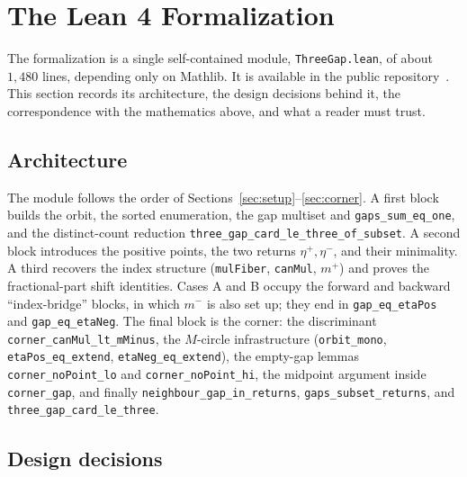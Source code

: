 \documentclass[11pt,reqno]{amsart}
\theoremstyle{plain}
\theoremstyle{definition}
\theoremstyle{remark}
\newcommand{\etap}{\eta^{+}}
\newcommand{\etam}{\eta^{-}}
\newcommand{\mpl}{m^{+}}
\newcommand{\mmi}{m^{-}}
\newcommand{\code}[1]{\texttt{#1}}
\begin{document}
\section{The Lean 4 Formalization}\label{sec:lean}

The formalization is a single self-contained module,
\code{ThreeGap.lean}, of about $1{,}480$ lines, depending only on
Mathlib.  It is available in the public repository~\cite{KunertThreeGap2026}.  This section
records its architecture, the design decisions behind it, the correspondence
with the mathematics above, and what a reader must trust.

\subsection{Architecture}

The module follows the order of Sections~\ref{sec:setup}--\ref{sec:corner}.  A
first block builds the orbit, the sorted enumeration, the gap multiset and
\code{gaps\_sum\_eq\_one}, and the distinct-count reduction
\code{three\_gap\_card\_le\_three\_of\_subset}.  A second block introduces the
positive points, the two returns $\etap,\etam$, and their minimality.  A third
recovers the index structure (\code{mulFiber}, \code{canMul}, $\mpl$) and
proves the fractional-part shift identities.  Cases A and B occupy the forward
and backward ``index-bridge'' blocks, in which $\mmi$ is also set up; they end
in \code{gap\_eq\_etaPos} and \code{gap\_eq\_etaNeg}.  The final block is the
corner: the discriminant
\code{corner\_canMul\_lt\_mMinus}, the $M$-circle infrastructure
(\code{orbit\_mono}, \code{etaPos\_eq\_extend}, \code{etaNeg\_eq\_extend}), the
empty-gap lemmas \code{corner\_noPoint\_lo} and \code{corner\_noPoint\_hi}, the
midpoint argument inside \code{corner\_gap}, and finally
\code{neighbour\_gap\_in\_returns}, \code{gaps\_subset\_returns}, and
\code{three\_gap\_card\_le\_three}.

\subsection{Design decisions}
\end{document}
